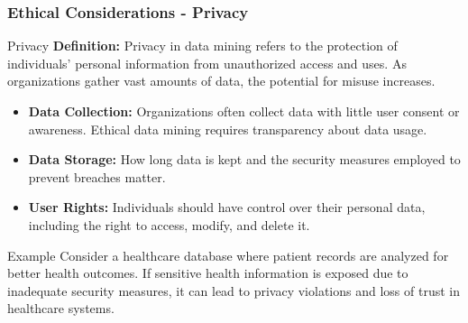 \documentclass[aspectratio=169]{beamer}
\begin{document}
\begin{frame}[fragile]
    \frametitle{Ethical Considerations - Privacy}
    \begin{block}{Privacy}
        \textbf{Definition:} Privacy in data mining refers to the protection of individuals’ personal information from unauthorized access and uses. As organizations gather vast amounts of data, the potential for misuse increases.
    \end{block}
    
    \begin{itemize}
        \item \textbf{Data Collection:} Organizations often collect data with little user consent or awareness. Ethical data mining requires transparency about data usage.
        \item \textbf{Data Storage:} How long data is kept and the security measures employed to prevent breaches matter.
        \item \textbf{User Rights:} Individuals should have control over their personal data, including the right to access, modify, and delete it.
    \end{itemize}
    
    \begin{block}{Example}
        Consider a healthcare database where patient records are analyzed for better health outcomes. If sensitive health information is exposed due to inadequate security measures, it can lead to privacy violations and loss of trust in healthcare systems.
    \end{block}
\end{frame}
\end{document}
